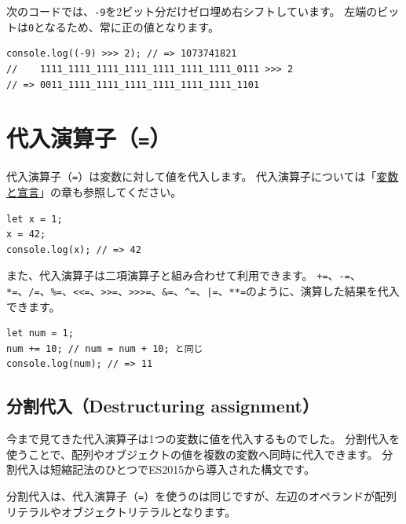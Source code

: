 次のコードでは、\texttt{-9}を2ビット分だけゼロ埋め右シフトしています。
左端のビットは\texttt{0}となるため、常に正の値となります。

\begin{lstlisting}
console.log((-9) >>> 2); // => 1073741821
//    1111_1111_1111_1111_1111_1111_1111_0111 >>> 2
// => 0011_1111_1111_1111_1111_1111_1111_1101
\end{lstlisting}

\hypertarget{assignment-operator}{%
\section{\texorpdfstring{代入演算子（\texttt{=}）}{代入演算子（=）}}\label{assignment-operator}}

代入演算子（\texttt{=}）は変数に対して値を代入します。
代入演算子については「\hyperlink{variable-and-declaration}{変数と宣言}」の章も参照してください。

\begin{lstlisting}
let x = 1;
x = 42;
console.log(x); // => 42
\end{lstlisting}

また、代入演算子は二項演算子と組み合わせて利用できます。
\lstinline{+=}、\lstinline{-=}、\lstinline{*=}、\lstinline{/=}、\lstinline{%=}、\lstinline{<<=}、\lstinline{>>=}、\lstinline{>>>=}、\lstinline{&=}、\lstinline{^=}、\lstinline{|=}、\lstinline{**=}のように、演算した結果を代入できます。

\begin{lstlisting}
let num = 1;
num += 10; // num = num + 10; と同じ
console.log(num); // => 11
\end{lstlisting}

\hypertarget{destructuring-assignment}{%
\subsection[分割代入（Destructuring
assignment）]{分割代入（Destructuring
assignment）\protect{}}\label{destructuring-assignment}}

今まで見てきた代入演算子は1つの変数に値を代入するものでした。
分割代入を使うことで、配列やオブジェクトの値を複数の変数へ同時に代入できます。
分割代入は短縮記法のひとつでES2015から導入された構文です。

分割代入は、代入演算子（\texttt{=}）を使うのは同じですが、左辺のオペランドが配列リテラルやオブジェクトリテラルとなります。

